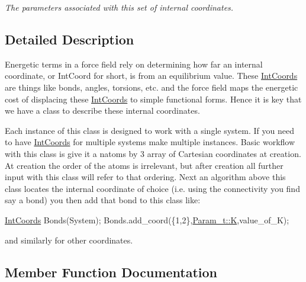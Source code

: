 \begin{DoxyCompactItemize}
\begin{DoxyCompactList}\small\item\em The parameters associated with this set of internal coordinates. \end{DoxyCompactList}\end{DoxyCompactItemize}


\subsection{Detailed Description}
Energetic terms in a force field rely on determining how far an internal coordinate, or Int\+Coord for short, is from an equilibrium value. These \hyperlink{classFManII_1_1IntCoords}{Int\+Coords} are things like bonds, angles, torsions, etc. and the force field maps the energetic cost of displacing these \hyperlink{classFManII_1_1IntCoords}{Int\+Coords} to simple functional forms. Hence it is key that we have a class to describe these internal coordinates.

Each instance of this class is designed to work with a single system. If you need to have \hyperlink{classFManII_1_1IntCoords}{Int\+Coords} for multiple systems make multiple instances. Basic workflow with this class is give it a natoms by 3 array of Cartesian coordinates at creation. At creation the order of the atoms is irrelevant, but after creation all further input with this class will refer to that ordering. Next an algorithm above this class locates the internal coordinate of choice (i.\+e. using the connectivity you find say a bond) you then add that bond to this class like\+: 
\begin{DoxyCode}
\hyperlink{classFManII_1_1IntCoords_aff5b80e7f579dd8aeac5200942b4db87}{IntCoords} Bonds(System);
Bonds.add\_coord(\{1,2\},\hyperlink{namespaceFManII_ab331802fde4c5f2564443f1704c25363acce4c4e3a7008d8a210e0950f0ae6646}{Param\_t::K},value\_of\_K);
\end{DoxyCode}
 and similarly for other coordinates. 

\subsection{Member Function Documentation}
